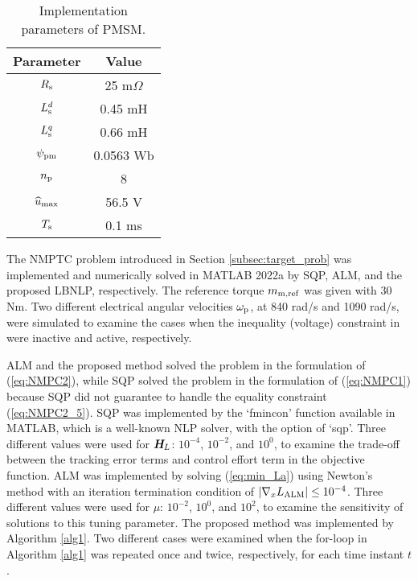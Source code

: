 \documentclass[journal]{IEEEtranTIE}
\begin{document}
\begin{table}
\caption{Implementation parameters of PMSM.}\label{tab:Comparison of LBNLP, SQP and ALM}
\centering
{\begin{tabular}{cc}\hline
Parameter & Value \\\hline\hline
\rowcolor{lightgray}
$R_{\mathrm{s}}$ & 25 m$\Omega$\\
$L_{\mathrm{s}}^{d}$ & 0.45 mH\\
\rowcolor{lightgray}
$L_{\mathrm{s}}^{q}$ & 0.66 mH\\
$\psi_{\mathrm{pm}}$ & 0.0563 Wb\\
\rowcolor{lightgray}
$n_{\mathrm{p}}$ & 8\\
$\widehat{u}_{\max}$ & 56.5 V \\
\rowcolor{lightgray}
$T_{\mathrm{s}}$ & 0.1 ms \\\hline
\end{tabular}}
\end{table}



The NMPTC problem introduced in Section \ref{subsec:target_prob} was implemented and numerically solved in MATLAB 2022a by SQP, ALM, and the proposed LBNLP, respectively. The reference torque $m_{\mathrm{m},\mathrm{ref}}$ was given with 30 Nm. Two different electrical angular velocities $\omega_{\mathrm{p}}$, at 840 rad/s and 1090 rad/s, were simulated to examine the cases when the inequality (voltage) constraint in were inactive and active, respectively. 

ALM and the proposed method solved the problem in the formulation of (\ref{eq:NMPC2}), while SQP solved the problem in the formulation of (\ref{eq:NMPC1}) because SQP did not guarantee to handle the equality constraint (\ref{eq:NMPC2_5}). SQP was implemented by the `fmincon' function available in MATLAB, which is a well-known NLP solver, with the option of `sqp'. Three different values were used for $\boldsymbol{H}_{\!L}$: $10^{-4}$, $10^{-2}$, and $10^{0}$, to examine the trade-off between the tracking error terms and control effort term in the objective function. ALM was implemented by solving (\ref{eq:min_La}) using Newton's method with an iteration termination condition of $\left| \nabla_x L_{\rm ALM} \right| \le 10^{-4}$. Three different values were used for $\mu$: $10^{-2}$, $10^{0}$, and $10^{2}$, to examine the sensitivity of solutions to this tuning parameter. The proposed method was implemented by Algorithm \ref{alg1}. Two different cases were examined when the for-loop in Algorithm \ref{alg1} was repeated once and twice, respectively, for each time instant $t$.
\end{document}
